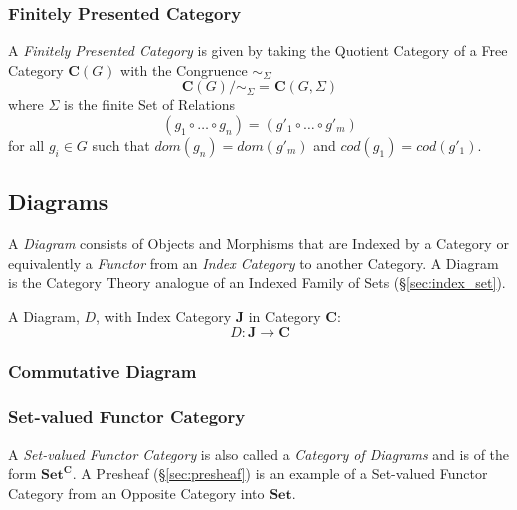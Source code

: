 \subsubsection{Finitely Presented Category}\label{sec:finitely_presented}

A \emph{Finitely Presented Category} is given by taking the Quotient
Category of a Free Category $\mathbf{C}(G)$ with the Congruence
$\sim_\Sigma$
\[
    \mathbf{C}(G) / \sim_{\Sigma} = \mathbf{C}(G,\Sigma)
\]
where $\Sigma$ is the finite Set of Relations
\[
    (g_1 \circ \ldots \circ g_n) = (g'_1 \circ \ldots \circ g'_m)
\]
for all $g_i \in G$ such that $dom(g_n) = dom(g'_m)$ and $cod(g_1) =
cod(g'_1)$.



\subsection{Diagrams}\label{sec:category_diagram}

A \emph{Diagram} consists of Objects and Morphisms that are Indexed by
a Category or equivalently a \emph{Functor} from an \emph{Index
  Category} to another Category. A Diagram is the Category Theory
analogue of an Indexed Family of Sets (\S\ref{sec:index_set}).

A Diagram, $D$, with Index Category $\mathbf{J}$ in Category
$\mathbf{C}$:
\[
    D : \mathbf{J} \rightarrow \mathbf{C}
\]



\subsubsection{Commutative Diagram}\label{sec:commutative_diagram}



\subsubsection{Set-valued Functor Category}\label{sec:setvalued_category}

A \emph{Set-valued Functor Category} is also called a \emph{Category
  of Diagrams} and is of the form $\mathbf{Set}^{\mathbf{C}}$. A
Presheaf (\S\ref{sec:presheaf}) is an example of a Set-valued
Functor Category from an Opposite Category into $\mathbf{Set}$.




